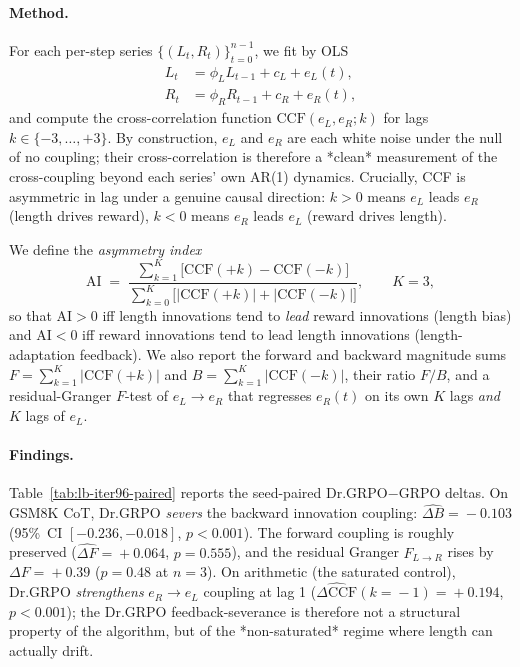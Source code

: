 \paragraph{Method.}  For each per-step series $\{(L_t, R_t)\}_{t=0}^{n-1}$,
we fit by OLS
\begin{align}
L_t &= \phi_L L_{t-1} + c_L + e_L(t),\\
R_t &= \phi_R R_{t-1} + c_R + e_R(t),
\end{align}
and compute the cross-correlation function
$\mathrm{CCF}(e_L, e_R; k)$ for lags $k\!\in\!\{-3,\dots,+3\}$.
By construction, $e_L$ and $e_R$ are each white noise under the null
of no coupling; their cross-correlation is therefore a *clean*
measurement of the cross-coupling beyond each series' own AR(1)
dynamics.  Crucially, CCF is asymmetric in lag under a genuine causal
direction: $k>0$ means $e_L$ leads $e_R$ (length drives reward),
$k<0$ means $e_R$ leads $e_L$ (reward drives length).

We define the \emph{asymmetry index}
\begin{equation}\label{eq:lb-iter96-ai}
\mathrm{AI} \;=\; \frac{\sum_{k=1}^{K}\bigl[\mathrm{CCF}(+k)-\mathrm{CCF}(-k)\bigr]}
                       {\sum_{k=0}^{K}\bigl[\lvert\mathrm{CCF}(+k)\rvert+\lvert\mathrm{CCF}(-k)\rvert\bigr]},
\qquad K = 3,
\end{equation}
so that $\mathrm{AI}>0$ iff length innovations tend to \emph{lead}
reward innovations (length bias) and $\mathrm{AI}<0$ iff reward
innovations tend to lead length innovations (length-adaptation
feedback).  We also report the forward and backward magnitude sums
$F\!=\!\sum_{k=1}^{K}\lvert\mathrm{CCF}(+k)\rvert$ and
$B\!=\!\sum_{k=1}^{K}\lvert\mathrm{CCF}(-k)\rvert$, their ratio
$F/B$, and a residual-Granger $F$-test of $e_L\!\to\!e_R$ that
regresses $e_R(t)$ on its own $K$ lags \emph{and} $K$ lags of $e_L$.

\paragraph{Findings.}  Table~\ref{tab:lb-iter96-paired} reports the
seed-paired Dr.GRPO$-$GRPO deltas.  On GSM8K CoT, Dr.GRPO
\emph{severs} the backward innovation coupling:
$\widehat{\Delta B}\!=\!-0.103$ (95\%~CI $[-0.236,-0.018]$,
$p\!<\!0.001$).  The forward coupling is roughly preserved
($\widehat{\Delta F}\!=\!+0.064$, $p\!=\!0.555$), and the residual
Granger $F_{L\to R}$ rises by $\Delta F\!=\!+0.39$ ($p\!=\!0.48$ at
$n\!=\!3$).  On arithmetic (the saturated control), Dr.GRPO
\emph{strengthens} $e_R\!\to\!e_L$ coupling at lag 1
($\widehat{\Delta\mathrm{CCF}}(k\!=\!-1)\!=\!+0.194$, $p\!<\!0.001$);
the Dr.GRPO feedback-severance is therefore not a structural
property of the algorithm, but of the *non-saturated* regime where
length can actually drift.

